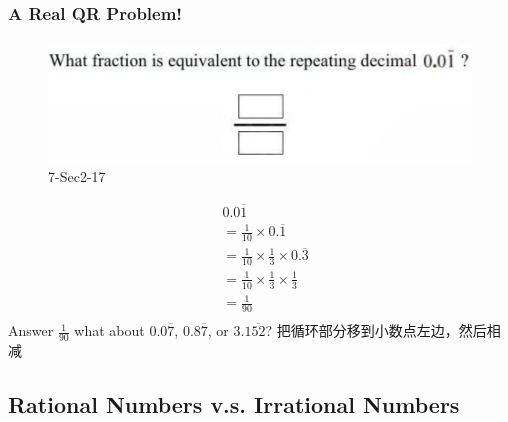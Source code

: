 \documentclass[
	11pt, %
]{beamer}
\begin{document}
\begin{frame}
	\frametitle{A Real QR Problem!}
	\framesubtitle{}
	\begin{figure}
		\includegraphics[width=0.6\linewidth]{Decimal_Example_Question1.png}
		\caption{7-Sec2-17}
	\end{figure}
	\pause
\begin{equation*}
	\begin{aligned}
	&0.0\overline{1}  \\
	& =\frac{1}{10} \times 0.\overline{1} \\
	& =\frac{1}{10} \times  \frac{1}{3} \times 0.\overline{3} \\
	& =\frac{1}{10} \times  \frac{1}{3} \times \frac{1}{3} \\
	& = \frac{1}{90}\\
	\end{aligned}
\end{equation*}
\pause
\bigskip
Answer \textbf{$\frac{1}{90}$} \quad what about $0.0\overline{7}$, $0.8\overline{7}$, or $3.1\overline{52}$? \pause 把循环部分移到小数点左边，然后相减
\end{frame}


\subsection{Rational Numbers v.s. Irrational Numbers}

\end{document}
